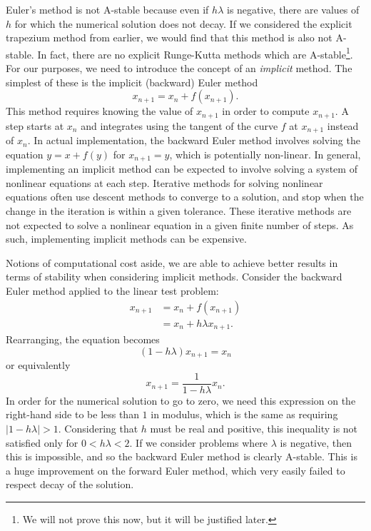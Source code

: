 \documentclass{report}
\theoremstyle{exampstyle} \newtheorem{example}[theorem]{Example}
\theoremstyle{exampstyle} \newtheorem{remark}[theorem]{Remark}
\theoremstyle{exampstyle} \newtheorem{definition}[theorem]{Definition}
\theoremstyle{exampstyle} \newtheorem{lemma}[theorem]{Lemma}
\begin{document}
Euler's method is not A-stable because even if $h \lambda$ is negative, there are values of $h$ for which the numerical solution does not decay.
If we considered the explicit trapezium method from earlier, we would find that this method is also not A-stable.
In fact, there are no explicit Runge-Kutta methods which are A-stable\footnote{
    We will not prove this now, but it will be justified later.
}.
For our purposes, we need to introduce the concept of an \textit{implicit} method.
The simplest of these is the implicit (backward) Euler method
\begin{equation}
    x_{n+1} = x_n + f(x_{n+1}).
\end{equation}
This method requires knowing the value of $x_{n+1}$ in order to compute $x_{n+1}$.
A step starts at $x_n$ and integrates using the tangent of the curve $f$ at $x_{n+1}$ instead of $x_n$.
In actual implementation, the backward Euler method involves solving the equation $y = x + f(y)$ for $x_{n+1} = y$, which is potentially non-linear.
In general, implementing an implicit method can be expected to involve solving a system of nonlinear equations at each step.
Iterative methods for solving nonlinear equations often use descent methods to converge to a solution, and stop when the change in the iteration is within a given tolerance.
These iterative methods are not expected to solve a nonlinear equation in a given finite number of steps.
As such, implementing implicit methods can be expensive.

Notions of computational cost aside, we are able to achieve better results in terms of stability when considering implicit methods.
Consider the backward Euler method applied to the linear test problem:
\begin{align*}
    x_{n+1} &= x_n + f(x_{n+1}) \\
    &= x_n + h\lambda x_{n+1}.
\end{align*}
Rearranging, the equation becomes
\begin{equation*}
    (1 - h \lambda)x_{n+1} = x_n
\end{equation*}
or equivalently
\begin{equation*}
    x_{n+1} = \frac{1}{1- h \lambda} x_n.
\end{equation*}
In order for the numerical solution to go to zero,
we need this expression on the right-hand side to be less than $1$ in modulus,
which is the same as requiring $|1 - h \lambda| > 1$.
Considering that $h$ must be real and positive,
this inequality is not satisfied only for $0 < h \lambda < 2$.
If we consider problems where $\lambda$ is negative, then this is impossible, and so the backward Euler method is clearly A-stable.
This is a huge improvement on the forward Euler method, which very easily failed to respect decay of the solution.
\end{document}
